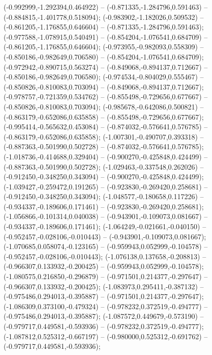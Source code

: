  (-0.992999,-1.292394,0.464922) -- (-0.871335,-1.284796,0.591463) -- (-0.884815,-1.401778,0.518094);
 (-0.983902,-1.182026,0.509532) -- (-0.861205,-1.176855,0.646604) -- (-0.871335,-1.284796,0.591463);
 (-0.977588,-1.078915,0.540491) -- (-0.854204,-1.076541,0.684709) -- (-0.861205,-1.176855,0.646604);
 (-0.973955,-0.982093,0.558309) -- (-0.850186,-0.982649,0.706580) -- (-0.854204,-1.076541,0.684709);
 (-0.972942,-0.890715,0.563274) -- (-0.849068,-0.894137,0.712667) -- (-0.850186,-0.982649,0.706580);
 (-0.974534,-0.804029,0.555467) -- (-0.850826,-0.810083,0.703094) -- (-0.849068,-0.894137,0.712667);
 (-0.978757,-0.721359,0.534762) -- (-0.855498,-0.729656,0.677667) -- (-0.850826,-0.810083,0.703094);
 (-0.985678,-0.642086,0.500821) -- (-0.863179,-0.652086,0.635858) -- (-0.855498,-0.729656,0.677667);
 (-0.995414,-0.565632,0.453084) -- (-0.874032,-0.576641,0.576785) -- (-0.863179,-0.652086,0.635858);
 (-1.007301,-0.490707,0.393318) -- (-0.887363,-0.501990,0.502728) -- (-0.874032,-0.576641,0.576785);
 (-1.018736,-0.414688,0.329404) -- (-0.900270,-0.425848,0.424499) -- (-0.887363,-0.501990,0.502728);
 (-1.029463,-0.337548,0.262026) -- (-0.912450,-0.348250,0.343094) -- (-0.900270,-0.425848,0.424499);
 (-1.039427,-0.259472,0.191265) -- (-0.923830,-0.269420,0.258681) -- (-0.912450,-0.348250,0.343094);
 (-1.048577,-0.180658,0.117226) -- (-0.934337,-0.189606,0.171461) -- (-0.923830,-0.269420,0.258681);
 (-1.056866,-0.101314,0.040038) -- (-0.943901,-0.109073,0.081667) -- (-0.934337,-0.189606,0.171461);
 (-1.064249,-0.021661,-0.040150) -- (-0.952457,-0.028106,-0.010443) -- (-0.943901,-0.109073,0.081667);
 (-1.070685,0.058074,-0.123165) -- (-0.959943,0.052999,-0.104578) -- (-0.952457,-0.028106,-0.010443);
 (-1.076138,0.137658,-0.208813) -- (-0.966307,0.133932,-0.200425) -- (-0.959943,0.052999,-0.104578);
 (-1.080575,0.216850,-0.296879) -- (-0.971501,0.214377,-0.297647) -- (-0.966307,0.133932,-0.200425);
 (-1.083973,0.295411,-0.387132) -- (-0.975486,0.294013,-0.395887) -- (-0.971501,0.214377,-0.297647);
 (-1.086309,0.373100,-0.479324) -- (-0.978232,0.372519,-0.494777) -- (-0.975486,0.294013,-0.395887);
 (-1.087572,0.449679,-0.573190) -- (-0.979717,0.449581,-0.593936) -- (-0.978232,0.372519,-0.494777);
 (-1.087812,0.525312,-0.667197) -- (-0.980000,0.525312,-0.691762) -- (-0.979717,0.449581,-0.593936);
